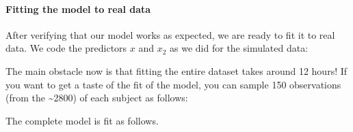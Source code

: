 \documentclass[12pt,]{krantz}
\newenvironment{Shaded}{\begin{snugshade}}{\end{snugshade}}
\newcommand{\DataTypeTok}[1]{\textcolor[rgb]{0.13,0.29,0.53}{#1}}
\newcommand{\DecValTok}[1]{\textcolor[rgb]{0.00,0.00,0.81}{#1}}
\newcommand{\FloatTok}[1]{\textcolor[rgb]{0.00,0.00,0.81}{#1}}
\newcommand{\KeywordTok}[1]{\textcolor[rgb]{0.13,0.29,0.53}{\textbf{#1}}}
\newcommand{\NormalTok}[1]{#1}
\newcommand{\OperatorTok}[1]{\textcolor[rgb]{0.81,0.36,0.00}{\textbf{#1}}}
\newcommand{\StringTok}[1]{\textcolor[rgb]{0.31,0.60,0.02}{#1}}
\let\oldparagraph\paragraph
\renewcommand{\paragraph}[1]{\oldparagraph{#1}\mbox{}}
\theoremstyle{definition}
\theoremstyle{definition}
\theoremstyle{definition}
\theoremstyle{remark}
\begin{document}
\hypertarget{fitting-the-model-to-real-data}{%
\paragraph{Fitting the model to real data}\label{fitting-the-model-to-real-data}}

After verifying that our model works as expected, we are ready to fit it to real data. We code the predictors \(x\) and \(x_2\) as we did for the simulated data:

\begin{Shaded}
\end{Shaded}

The main obstacle now is that fitting the entire dataset takes around 12 hours! If you want to get a taste of the fit of the model, you can sample 150 observations (from the \textasciitilde{}2800) of each subject as follows:

\begin{Shaded}
\end{Shaded}

The complete model is fit as follows.

\begin{Shaded}
\end{Shaded}
\end{document}
